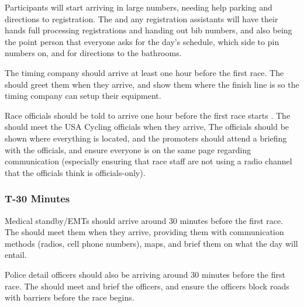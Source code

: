 Participants will start arriving in large numbers, needing help parking and directions to registration.
The  and any registration assistants will have their hands full processing registrations and handing out bib numbers,
and also being the point person that everyone asks for the day's schedule, which side to pin numbers on, and for directions to the bathrooms.

The timing company should arrive at least one hour before the first race.
The  should greet them when they arrive,
and show them where the finish line is so the timing company can setup their equipment.

Race officials should be told to arrive one hour before the first race starts%
.
The  should meet the USA Cycling officials when they arrive,
The officials should be shown where everything is located, and the promoters should attend a briefing with the officials,
and ensure everyone is on the same page regarding communication (especially ensuring that race staff are not using a radio channel that the officials think is officials-only).

\subsubsection{T-30 Minutes}

Medical standby/EMTs should arrive around 30 minutes before the first race.
The  should meet them when they arrive,
providing them with communication methods (radios, cell phone numbers), maps, and brief them on what the day will entail.

Police detail officers should also be arriving around 30 minutes before the first race.
The  should meet and brief the officers, and ensure the officers block roads with barriers
before the race begins.
